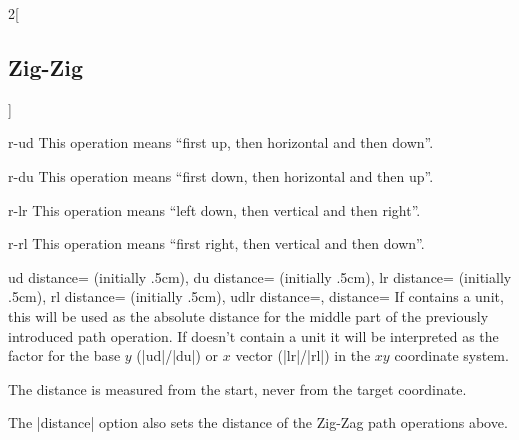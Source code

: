 \begin{multicols*}{2}[\subsection{Zig-Zig}]
\begin{pathoperation}{r-ud}{}
  This operation means ``first up, then horizontal and then down''.
\end{pathoperation}
\begin{pathoperation}{r-du}{}
  This operation means ``first down, then horizontal and then up''.
\end{pathoperation}
\begin{pathoperation}{r-lr}{}
  This operation means ``left down, then vertical and then right''.
\end{pathoperation}
\begin{pathoperation}{r-rl}{}
  This operation means ``first right, then vertical and then down''.
\end{pathoperation}

\newcolumn
\begin{keylist}{%
  ud distance= (initially .5cm),
  du distance= (initially .5cm),
  lr distance= (initially .5cm),
  rl distance= (initially .5cm),
  udlr distance=,
  distance=}%
  If  contains a unit, this will be used as the absolute distance
  for the middle part of the previously introduced path operation.
  If  doesn't contain a unit it will be interpreted
  as the factor for the base $y$ (|ud|/|du|) or $x$ vector (|lr|/|rl|)
  in the $x\!y$ coordinate system.
  
  The distance is measured from the start, never from the target coordinate.
  
  The |distance| option also sets the distance of the Zig-Zag path operations above.
\end{keylist}
\end{multicols*}

